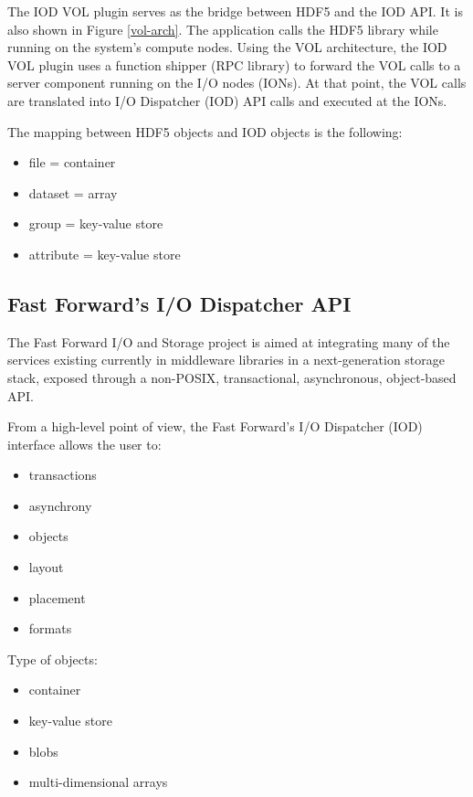 \documentclass[conference]{IEEEtran}
\begin{document}
The IOD VOL plugin serves as the bridge between HDF5 and the IOD API. It
is also shown in Figure \ref{vol-arch}. The application calls the HDF5
library while running on the system's compute nodes. Using the VOL
architecture, the IOD VOL plugin uses a function shipper (RPC library)
to forward the VOL calls to a server component running on the I/O nodes
(IONs). At that point, the VOL calls are translated into I/O Dispatcher
(IOD) API calls and executed at the IONs.

The mapping between HDF5 objects and IOD objects is the following:

\begin{itemize}
\itemsep1pt\parskip0pt
\item
  file = container
\item
  dataset = array
\item
  group = key-value store
\item
  attribute = key-value store
\end{itemize}

\subsection{Fast Forward's I/O Dispatcher
API}\label{fast-forwards-io-dispatcher-api}

The Fast Forward I/O and Storage project is aimed at integrating many of
the services existing currently in middleware libraries in a
next-generation storage stack, exposed through a non-POSIX,
transactional, asynchronous, object-based API.

From a high-level point of view, the Fast Forward's I/O Dispatcher (IOD)
interface allows the user to:

\begin{itemize}
\itemsep1pt\parskip0pt
\item
  transactions
\item
  asynchrony
\item
  objects
\item
  layout
\item
  placement
\item
  formats
\end{itemize}

Type of objects:

\begin{itemize}
\itemsep1pt\parskip0pt
\item
  container
\item
  key-value store
\item
  blobs
\item
  multi-dimensional arrays
\end{itemize}
\end{document}
